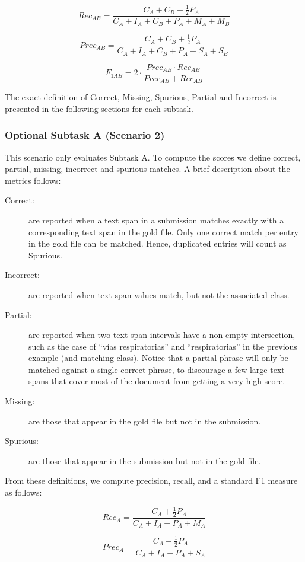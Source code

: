 \documentclass[11pt,a4paper]{article}
\begin{document}
$$Rec_{AB} = \frac{C_A + C_B + \frac{1}{2} P_A}{C_A + I_A + C_B + P_A + M_A + M_B} $$

$$Prec_{AB} = \frac{C_A + C_B + \frac{1}{2} P_A}{C_A + I_A + C_B + P_A + S_A + S_B} $$

$$F_{1AB} = 2 \cdot \frac{Prec_{AB} \cdot Rec_{AB}}{Prec_{AB} + Rec_{AB}} $$

The exact definition of Correct, Missing, Spurious, Partial and Incorrect is presented in the following sections for each subtask.

\subsubsection{Optional Subtask A (Scenario 2)}

This scenario only evaluates Subtask A. To compute the scores we define correct, partial, missing, incorrect and spurious matches. A brief description about the metrics follows:

\begin{description}
    \item[Correct:] are reported when a text span in a submission matches exactly with a corresponding text span in the gold file. Only one correct match per entry in the gold file can be matched. Hence, duplicated entries will count as Spurious.
    \item[Incorrect:] are reported when text span values match, but not the associated class.
    \item[Partial:] are reported when two text span intervals have a non-empty intersection, such as the case of ``vías respiratorias'' and ``respiratorias'' in the previous example (and matching class). Notice that a partial phrase will only be matched against a single correct phrase, to discourage a few large text spans that cover most of the document from getting a very high score.
    \item[Missing:] are those that appear in the gold file but not in the submission.
    \item[Spurious:] are those that appear in the submission but not in the gold file.
\end{description}

From these definitions, we compute precision, recall, and a standard F1 measure as follows:

$$Rec_{A} = \frac{C_A + \frac{1}{2} P_A}{C_A + I_A + P_A + M_A} $$

$$Prec_{A} = \frac{C_A + \frac{1}{2} P_A}{C_A + I_A + P_A + S_A} $$
\end{document}
